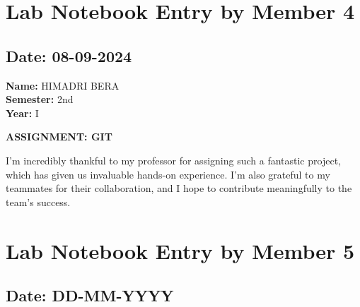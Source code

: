 \documentclass[12pt]{article}
\begin{document}
\newpage

\section{Lab Notebook Entry by Member 4}
\subsection*{Date: 08-09-2024}

\begin{flushright}
\textbf{Name:} HIMADRI BERA \\
\textbf{Semester:} 2nd \\
\textbf{Year:} I \\
\end{flushright}

\begin{center}
\Huge \textbf{ASSIGNMENT: GIT}
\end{center}

I'm incredibly thankful to my professor for assigning such a fantastic project, which has given us invaluable hands-on experience. I'm also grateful to my teammates for their collaboration, and I hope to contribute meaningfully to the team's success.

\newpage

\section{Lab Notebook Entry by Member 5}
\subsection*{Date: DD-MM-YYYY}
\end{document}
